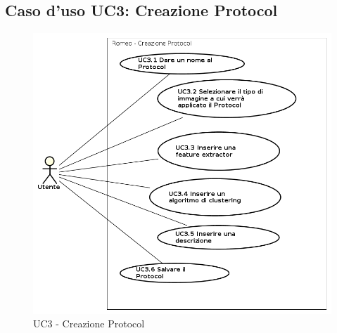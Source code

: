 \subsection{Caso d'uso UC3: Creazione Protocol}
\begin{figure}[!h]
\begin{center}
\includegraphics[scale=0.6]{./img/Use_Case/UC3}
\caption{UC3 - Creazione Protocol}
\end{center}
\end{figure}
